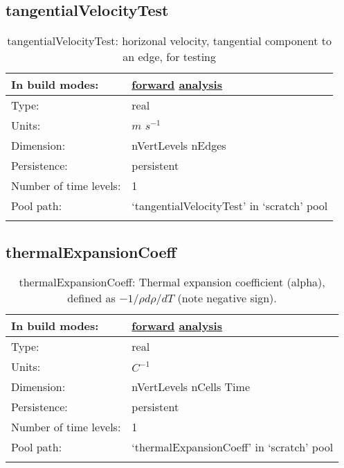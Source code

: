 \subsection[tangentialVelocityTest]{tangentialVelocityTest}
\label{subsec:var_sec_scratch_tangentialVelocityTest}
\begin{center}
\begin{longtable}{| p{2.0in} | p{4.0in} |}
        \hline 
        In build modes: & \hyperref[subsec:forward_var_tab_scratch]{forward} \hyperref[subsec:analysis_var_tab_scratch]{analysis} \\
        \hline 
        Type: & real \\
        \hline 
        Units: & $m$ $s^{-1}$ \\
        \hline 
        Dimension: & nVertLevels nEdges \\
        \hline 
        Persistence: & persistent \\
        \hline 
        Number of time levels: & 1 \\
        \hline 
            Pool path: & `tangentialVelocityTest' in `scratch' pool \\
		 \hline 
    \caption{tangentialVelocityTest: horizonal velocity, tangential component to an edge, for testing}
\end{longtable}
\end{center}
\subsection[thermalExpansionCoeff]{thermalExpansionCoeff}
\label{subsec:var_sec_scratch_thermalExpansionCoeff}
\begin{center}
\begin{longtable}{| p{2.0in} | p{4.0in} |}
        \hline 
        In build modes: & \hyperref[subsec:forward_var_tab_scratch]{forward} \hyperref[subsec:analysis_var_tab_scratch]{analysis} \\
        \hline 
        Type: & real \\
        \hline 
        Units: & $C^{-1}$ \\
        \hline 
        Dimension: & nVertLevels nCells Time \\
        \hline 
        Persistence: & persistent \\
        \hline 
        Number of time levels: & 1 \\
        \hline 
            Pool path: & `thermalExpansionCoeff' in `scratch' pool \\
		 \hline 
    \caption{thermalExpansionCoeff:  Thermal expansion coefficient (alpha), defined as  $-1/\rho d\rho/dT$  (note negative sign).}
\end{longtable}
\end{center}
